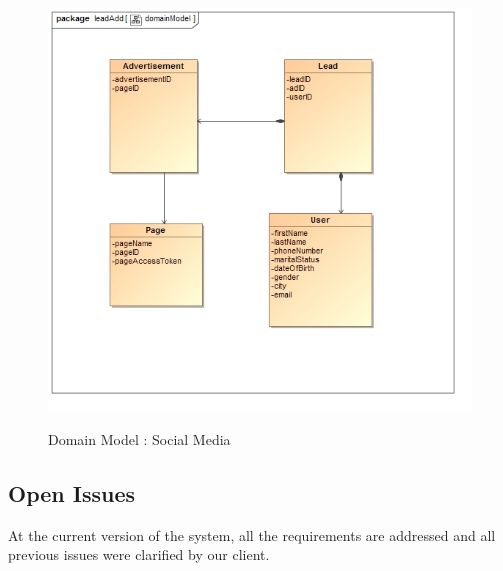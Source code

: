 \documentclass{article}
\begin{document}
\begin{figure}[H]
\includegraphics[width=\textwidth]{images/class__leadAdd__domainModel.jpg}  \\
\caption{Domain Model : Social Media}
\label{fig:domain_user}
\end{figure}


\subsection{Open Issues}\label{sec:open}
At the current version of  the system, all the requirements are addressed and all previous issues were clarified by our client.
\end{document}
